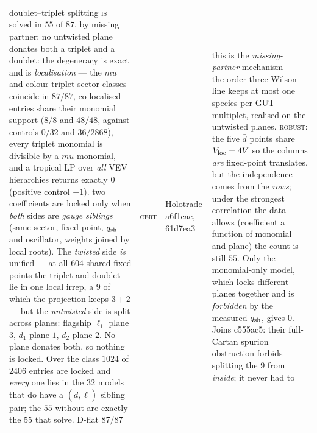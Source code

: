 \documentclass[12pt,a4paper]{article}
\def\mathbf#1{#1}%
\def\textbf#1{#1}%
\def\texttt#1{#1}%
\def\mu{mu}%
\theoremstyle{definition}
\begin{document}
\begin{center}
\begin{tabular}{@{}p{}llp{}@{}}
\textbf{doublet--triplet splitting \textsc{is} solved in $55$ of $87$, by missing partner: no untwisted plane donates both a triplet and a doublet}: the degeneracy is exact and is \emph{localisation} --- the $\mu$ and colour-triplet sector classes coincide in $87/87$, co-localised entries share their monomial support ($8/8$ and $48/48$, against controls $0/32$ and $36/2868$), every triplet monomial is divisible by a $\mu$ monomial, and a tropical LP over \emph{all} VEV hierarchies returns exactly $0$ (positive control $+1$). two coefficients are locked only when \emph{both} sides are \emph{gauge siblings} (same sector, fixed point, $q_{\rm sh}$ and oscillator, weights joined by local roots). The \emph{twisted} side \emph{is} unified --- at all $604$ shared fixed points the triplet and doublet lie in one local irrep, a $\mathbf 9$ of which the projection keeps $3{+}2$ --- but the \emph{untwisted} side is split across planes: flagship $\bar\ell_1$ plane $3$, $d_1$ plane $1$, $d_2$ plane $2$. No plane donates both, so nothing is locked. Over the class $1024$ of $2406$ entries are locked and \emph{every} one lies in the $32$ models that do have a $(d,\bar\ell)$ sibling pair; the $55$ without are exactly the $55$ that solve. D-flat $87/87$ & \textsc{cert} & Holotrade \texttt{a6f1cae}, \texttt{61d7ea3} & this is the \emph{missing-partner} mechanism --- the order-three Wilson line keeps at most one species per GUT multiplet, realised on the untwisted planes. \textsc{robust}: the five $\bar d$ points share $V_{\rm loc}=4V$ so the columns \emph{are} fixed-point translates, but the independence comes from the \emph{rows}; under the strongest correlation the data allows (coefficient a function of monomial and plane) the count is still $55$. Only the monomial-only model, which locks different planes together and is \emph{forbidden} by the measured $q_{\rm sh}$, gives $0$. Joins \texttt{c555ac5}: their full-Cartan spurion obstruction forbids splitting the $\mathbf 9$ from \emph{inside}; it never had to \\

\end{tabular}
\end{center}
\end{document}
